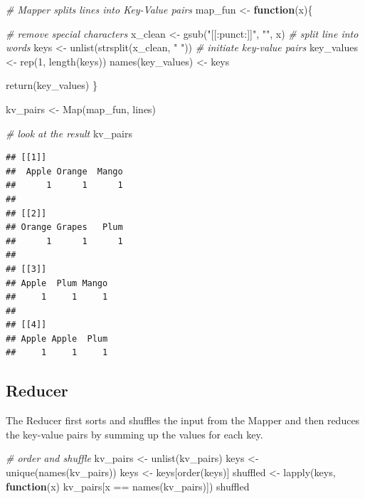 \documentclass[
  12pt,
]{style/krantz}
\newenvironment{Shaded}{\begin{snugshade}}{\end{snugshade}}
\newcommand{\CommentTok}[1]{\textcolor[rgb]{0.56,0.35,0.01}{\textit{#1}}}
\newcommand{\ControlFlowTok}[1]{\textcolor[rgb]{0.13,0.29,0.53}{\textbf{#1}}}
\newcommand{\DecValTok}[1]{\textcolor[rgb]{0.00,0.00,0.81}{#1}}
\newcommand{\FunctionTok}[1]{\textcolor[rgb]{0.00,0.00,0.00}{#1}}
\newcommand{\NormalTok}[1]{#1}
\newcommand{\OtherTok}[1]{\textcolor[rgb]{0.56,0.35,0.01}{#1}}
\newcommand{\SpecialCharTok}[1]{\textcolor[rgb]{0.00,0.00,0.00}{#1}}
\newcommand{\StringTok}[1]{\textcolor[rgb]{0.31,0.60,0.02}{#1}}
\begin{document}
\begin{Shaded}
\begin{Highlighting}[]
\CommentTok{\# Mapper splits lines into Key{-}Value pairs}
\NormalTok{map\_fun }\OtherTok{\textless{}{-}}
     \ControlFlowTok{function}\NormalTok{(x)\{}
          
          \CommentTok{\# remove special characters}
\NormalTok{          x\_clean }\OtherTok{\textless{}{-}} \FunctionTok{gsub}\NormalTok{(}\StringTok{"[[:punct:]]"}\NormalTok{, }\StringTok{""}\NormalTok{, x)}
          \CommentTok{\# split line into words}
\NormalTok{          keys }\OtherTok{\textless{}{-}} \FunctionTok{unlist}\NormalTok{(}\FunctionTok{strsplit}\NormalTok{(x\_clean, }\StringTok{" "}\NormalTok{))}
          \CommentTok{\# initiate key{-}value pairs}
\NormalTok{          key\_values }\OtherTok{\textless{}{-}} \FunctionTok{rep}\NormalTok{(}\DecValTok{1}\NormalTok{, }\FunctionTok{length}\NormalTok{(keys))}
          \FunctionTok{names}\NormalTok{(key\_values) }\OtherTok{\textless{}{-}}\NormalTok{ keys}
          
          \FunctionTok{return}\NormalTok{(key\_values)}
\NormalTok{     \}}

\NormalTok{kv\_pairs }\OtherTok{\textless{}{-}} \FunctionTok{Map}\NormalTok{(map\_fun, lines)}

\CommentTok{\# look at the result}
\NormalTok{kv\_pairs}
\end{Highlighting}
\end{Shaded}

\begin{verbatim}
## [[1]]
##  Apple Orange  Mango 
##      1      1      1 
## 
## [[2]]
## Orange Grapes   Plum 
##      1      1      1 
## 
## [[3]]
## Apple  Plum Mango 
##     1     1     1 
## 
## [[4]]
## Apple Apple  Plum 
##     1     1     1
\end{verbatim}

\hypertarget{reducer}{%
\subsection{Reducer}\label{reducer}}

The Reducer first sorts and shuffles the input from the Mapper and then reduces the key-value pairs by summing up the values for each key.

\begin{Shaded}
\begin{Highlighting}[]
\CommentTok{\# order and shuffle}
\NormalTok{kv\_pairs }\OtherTok{\textless{}{-}} \FunctionTok{unlist}\NormalTok{(kv\_pairs)}
\NormalTok{keys }\OtherTok{\textless{}{-}} \FunctionTok{unique}\NormalTok{(}\FunctionTok{names}\NormalTok{(kv\_pairs))}
\NormalTok{keys }\OtherTok{\textless{}{-}}\NormalTok{ keys[}\FunctionTok{order}\NormalTok{(keys)]}
\NormalTok{shuffled }\OtherTok{\textless{}{-}} \FunctionTok{lapply}\NormalTok{(keys,}
                    \ControlFlowTok{function}\NormalTok{(x) kv\_pairs[x }\SpecialCharTok{==} \FunctionTok{names}\NormalTok{(kv\_pairs)])}
\NormalTok{shuffled}
\end{Highlighting}
\end{Shaded}
\end{document}
